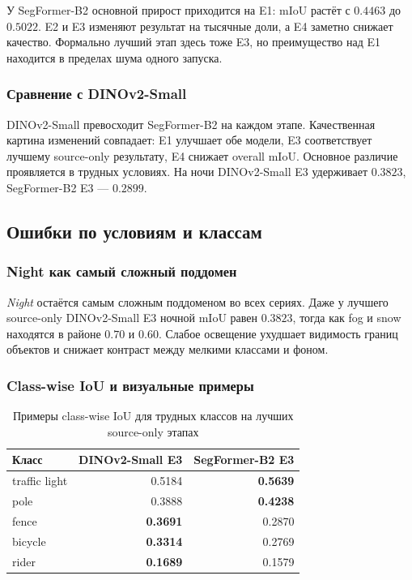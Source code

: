 \documentclass[14pt,a4paper]{extarticle}
\begin{document}
У SegFormer-B2 основной прирост приходится на E1: mIoU растёт с $0.4463$ до $0.5022$. E2 и E3 изменяют результат на тысячные доли, а E4 заметно снижает качество. Формально лучший этап здесь тоже E3, но преимущество над E1 находится в пределах шума одного запуска.

\subsubsection{Сравнение с DINOv2-Small}

DINOv2-Small превосходит SegFormer-B2 на каждом этапе. Качественная картина изменений совпадает: E1 улучшает обе модели, E3 соответствует лучшему source-only результату, E4 снижает overall mIoU. Основное различие проявляется в трудных условиях. На ночи DINOv2-Small E3 удерживает $0.3823$, SegFormer-B2 E3 --- $0.2899$.

\subsection{Ошибки по условиям и классам}

\subsubsection{Night как самый сложный поддомен}

\textit{Night} остаётся самым сложным поддоменом во всех сериях. Даже у лучшего source-only DINOv2-Small E3 ночной mIoU равен $0.3823$, тогда как fog и snow находятся в районе $0.70$ и $0.60$. Слабое освещение ухудшает видимость границ объектов и снижает контраст между мелкими классами и фоном.

\subsubsection{Class-wise IoU и визуальные примеры}

\begin{table}[H]
    \centering
    \caption{Примеры class-wise IoU для трудных классов на лучших source-only этапах}
    \label{tab:hard_class_iou_source_only}
    \small
    \begin{tabular}{lrr}
        \toprule
        Класс & DINOv2-Small E3 & SegFormer-B2 E3 \\
        \midrule
        traffic light & 0.5184 & \textbf{0.5639} \\
        pole & 0.3888 & \textbf{0.4238} \\
        fence & \textbf{0.3691} & 0.2870 \\
        bicycle & \textbf{0.3314} & 0.2769 \\
        rider & \textbf{0.1689} & 0.1579 \\
        \bottomrule
    \end{tabular}
\end{table}
\end{document}
